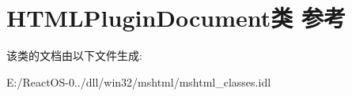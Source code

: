 \hypertarget{class_h_t_m_l_plugin_document}{}\section{H\+T\+M\+L\+Plugin\+Document类 参考}
\label{class_h_t_m_l_plugin_document}


该类的文档由以下文件生成\+:\begin{DoxyCompactItemize}
\item 
E\+:/\+React\+O\+S-\/0../dll/win32/mshtml/mshtml\+\_\+classes.\+idl\end{DoxyCompactItemize}

